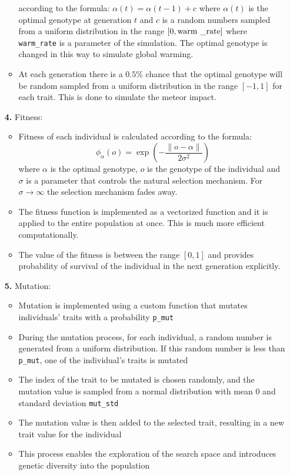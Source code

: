 \documentclass{article}
\begin{document}
\begin{itemize}
\begin{itemize}
            according to the formula: $\alpha(t)=\alpha(t-1)+c$ where $\alpha(t)$ is the optimal genotype
            at generation $t$ and $c$ is a random numbers sampled from a uniform distribution in the range
            $[0, \text{warm \textunderscore rate}]$ where \verb|warm_rate| is a parameter of the simulation. The optimal 
            genotype is changed in this way to simulate global warming.
            \item At each generation there is a $0.5\%$ chance that the optimal genotype will be random 
            sampled from a uniform distribution in the range $[-1, 1]$ for each trait. This is done to
            simulate the meteor impact.
        \end{itemize}
    \item[\textbf{4.}] Fitness:
        \begin{itemize}
            \item Fitness of each individual is calculated according to the formula:
            $$
            \phi_{\alpha}(o)=\exp \left(-\frac{\|o-\alpha\|}{2 \sigma^{2}}\right)
            $$
            where $\alpha$ is the optimal genotype, $o$ is the genotype of the individual and $\sigma$ is
            a parameter that controls the natural selection mechanism. For $\sigma \rightarrow \infty$ the
            selection mechanism fades away.
            \item The fitness function is implemented as a vectorized function and it is applied to the 
            entire population at once. This is much more efficient computationally.
            \item The value of the fitness is between the range $[0, 1]$ and provides probability of 
            survival of the individual in the next generation explicitly.
        \end{itemize}
    \item[\textbf{5.}] Mutation:
        \begin{itemize}
            \item Mutation is implemented using a custom function that mutates individuals' traits with a probability \verb|p_mut|
            \item During the mutation process, for each individual, a random number is generated from a uniform distribution. If this random number is less than \verb|p_mut|, one of the individual's traits is mutated
            \item The index of the trait to be mutated is chosen randomly, and the mutation value is sampled from a normal distribution with mean 0 and standard deviation \verb|mut_std|
            \item The mutation value is then added to the selected trait, resulting in a new trait value for the individual
            \item This process enables the exploration of the search space and introduces genetic diversity into the population
        \end{itemize}


\end{itemize}
\end{document}
